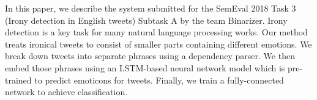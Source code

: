 In this paper, we describe the system submitted for the  SemEval  2018  Task  3  (Irony detection in English tweets) Subtask  A by the team Binarizer. Irony detection is a key task for many natural language processing works. Our method treats ironical tweets to consist of smaller parts containing different emotions. We break down tweets into separate phrases using a dependency parser. We then embed those phrases using an LSTM-based neural network model which is pre-trained to predict emoticons for tweets. Finally, we train a fully-connected network to achieve classification.
